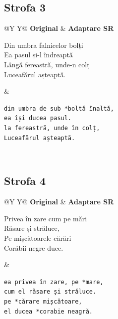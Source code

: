 \documentclass[12pt,onecolumn,letterpaper]{article}
\newcommand{\rs}[1]{\texttt{#1}}
\begin{document}
\subsection*{Strofa 3}
\noindent
\begin{tabularx}{\linewidth}{@{}Y Y@{}}
\textbf{Original} & \textbf{Adaptare SR} \\
\begin{minipage}[t]{\linewidth}\vspace{0pt}
Din umbra falnicelor bolți\\
Ea pasul și-l îndreaptă\\
Lângă fereastră, unde-n colț\\
Luceafărul așteaptă.
\end{minipage}
&
\begin{minipage}[t]{\linewidth}\vspace{0pt}
\rs{din umbra de sub *boltă înaltă,}\\
\rs{ea își ducea pasul.}\\
\rs{la fereastră, unde în colț,}\\
\rs{Luceafărul așteaptă.}
\end{minipage}
\\
\end{tabularx}

\subsection*{Strofa 4}
\noindent
\begin{tabularx}{\linewidth}{@{}Y Y@{}}
\textbf{Original} & \textbf{Adaptare SR} \\
\begin{minipage}[t]{\linewidth}\vspace{0pt}
Privea în zare cum pe mări\\
Răsare și străluce,\\
Pe mișcătoarele cărări\\
Corăbii negre duce.
\end{minipage}
&
\begin{minipage}[t]{\linewidth}\vspace{0pt}
\rs{ea privea în zare, pe *mare,}\\
\rs{cum el răsare și străluce.}\\
\rs{pe *cărare mișcătoare,}\\
\rs{el ducea *corabie neagră.}
\end{minipage}
\\
\end{tabularx}
\end{document}
